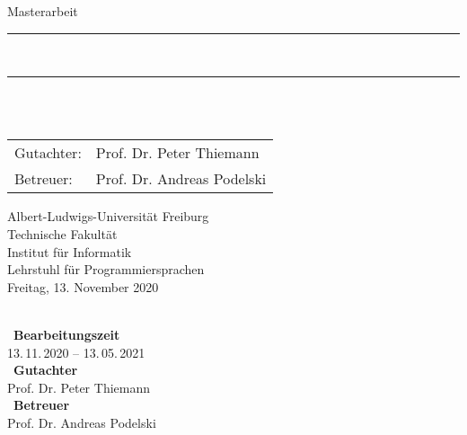 \begin{titlepage}
\begin{center}

\newcommand{\HorizontalLine}{\rule{\linewidth}{0.3mm}}

{\Large Masterarbeit}\\[1.3cm]


\HorizontalLine \\[0.4cm]
{ \huge \bfseries \thetitle }
\HorizontalLine \\[1.5cm]


{\Huge \theauthor} \\[2cm]


\begin{tabular}[hc]{>{\huge}l >{\huge}l}
  Gutachter: & Prof. Dr. Peter Thiemann \\[0.3cm]
  Betreuer: & Prof. Dr. Andreas Podelski \\[1.2cm]
\end{tabular}
\vfill  %

\Large {
    Albert-Ludwigs-Universität Freiburg\\
    Technische Fakultät\\
    Institut für Informatik\\
    Lehrstuhl für Programmiersprachen\\[1cm]

    Freitag, 13. November 2020
    \\
}
\end{center}
\end{titlepage}

\thispagestyle{empty}
\ \vfill \ \\  %
\
\textbf{Bearbeitungszeit}            \smallskip{} \\
13.\,11.\,2020 -- 13.\,05.\,2021   \bigskip{} \\
\
\textbf{Gutachter}                  \smallskip{} \\
Prof. Dr. Peter Thiemann               \bigskip{} \\
\
\textbf{Betreuer}                  \smallskip{} \\
Prof. Dr. Andreas Podelski
